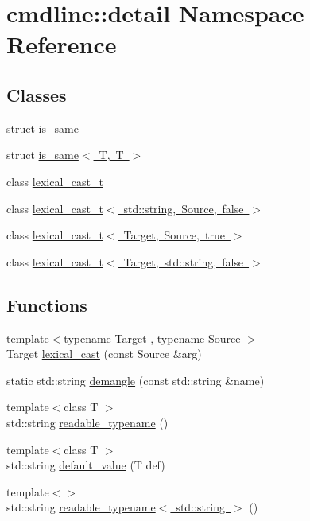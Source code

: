 \hypertarget{namespacecmdline_1_1detail}{}\section{cmdline\+::detail Namespace Reference}
\label{namespacecmdline_1_1detail}
\subsection*{Classes}
\begin{DoxyCompactItemize}
\item 
struct \mbox{\hyperlink{structcmdline_1_1detail_1_1is__same}{is\+\_\+same}}
\item 
struct \mbox{\hyperlink{structcmdline_1_1detail_1_1is__same_3_01_t_00_01_t_01_4}{is\+\_\+same$<$ T, T $>$}}
\item 
class \mbox{\hyperlink{classcmdline_1_1detail_1_1lexical__cast__t}{lexical\+\_\+cast\+\_\+t}}
\item 
class \mbox{\hyperlink{classcmdline_1_1detail_1_1lexical__cast__t_3_01std_1_1string_00_01_source_00_01false_01_4}{lexical\+\_\+cast\+\_\+t$<$ std\+::string, Source, false $>$}}
\item 
class \mbox{\hyperlink{classcmdline_1_1detail_1_1lexical__cast__t_3_01_target_00_01_source_00_01true_01_4}{lexical\+\_\+cast\+\_\+t$<$ Target, Source, true $>$}}
\item 
class \mbox{\hyperlink{classcmdline_1_1detail_1_1lexical__cast__t_3_01_target_00_01std_1_1string_00_01false_01_4}{lexical\+\_\+cast\+\_\+t$<$ Target, std\+::string, false $>$}}
\end{DoxyCompactItemize}
\subsection*{Functions}
\begin{DoxyCompactItemize}
\item 
{\footnotesize template$<$typename Target , typename Source $>$ }\\Target \mbox{\hyperlink{namespacecmdline_1_1detail_a5cd4d0bedba599ae78fc3b477d5b89fa}{lexical\+\_\+cast}} (const Source \&arg)
\item 
static std\+::string \mbox{\hyperlink{namespacecmdline_1_1detail_a531047ed8f52b62caae26ab166520987}{demangle}} (const std\+::string \&name)
\item 
{\footnotesize template$<$class T $>$ }\\std\+::string \mbox{\hyperlink{namespacecmdline_1_1detail_a9e3c4f02792dba7836cb5d933bf8665f}{readable\+\_\+typename}} ()
\item 
{\footnotesize template$<$class T $>$ }\\std\+::string \mbox{\hyperlink{namespacecmdline_1_1detail_a0d8a8c2598d920091d2c1055516f8005}{default\+\_\+value}} (T def)
\item 
{\footnotesize template$<$$>$ }\\std\+::string \mbox{\hyperlink{namespacecmdline_1_1detail_aeaaa18e134cb1066b14d447a43c6386e}{readable\+\_\+typename$<$ std\+::string $>$}} ()
\end{DoxyCompactItemize}



